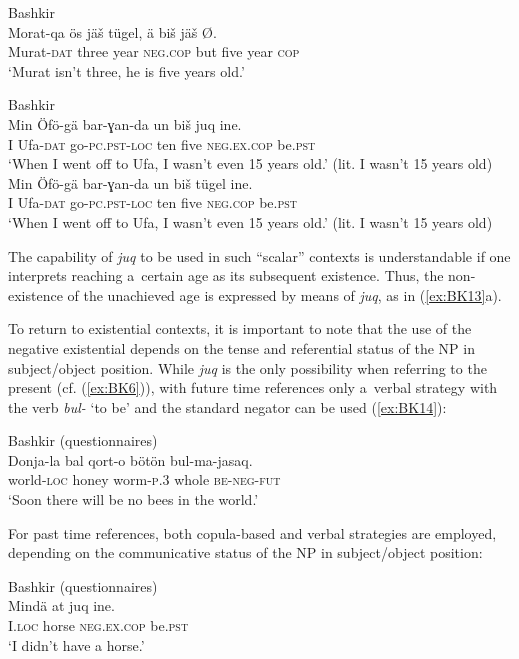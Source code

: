 \documentclass[output=paper]{langsci/langscibook}
\begin{document}
\ea Bashkir \citep[138]{mishchenko2017a} \label{ex:BK12}\\
	\gll Morat-qa	ös		jäš		tügel,			ä		biš		jäš		Ø.\\
	Murat-\textsc{dat}	three	year	\textsc{neg.cop}		but	five	year	\textsc{cop}\\
	\glt `Murat isn’t three, he is five years old.'
\z


\ea Bashkir \citep[139]{mishchenko2017a} \label{ex:BK13}\\
  \ea
	\gll Min	Öfö-gä	bar-ɣan-da		un		biš		juq			ine.\\
	I		Ufa-\textsc{dat}	go-\textsc{pc.pst-loc}	ten	five	\textsc{neg.ex.cop}	be.\textsc{pst}\\
	\glt `When I went off to Ufa, I wasn’t even 15 years old.' (lit. I wasn’t 15 years old)
  \ex
	\gll Min	Öfö-gä	bar-ɣan-da		un		biš		tügel			ine.\\
	I		Ufa-\textsc{dat}	go-\textsc{pc.pst-loc}	ten	five	\textsc{neg.cop}		be.\textsc{pst}\\
	\glt `When I went off to Ufa, I wasn’t even 15 years old.' (lit. I wasn’t 15 years old)
\z \z

The capability of \textit{juq} to be used in such “scalar” contexts is understandable if one interprets reaching a certain age as its subsequent existence. Thus, the non-existence of the unachieved age is expressed by means of \textit{juq}, as in (\ref{ex:BK13}a).

To return to existential contexts, it is important to note that the use of the negative existential depends on the tense and referential status of the NP in subject/object position. While \textit{juq} is the only possibility when referring to the present (cf. (\ref{ex:BK6})), with future time references only a verbal strategy with the verb \textit{bul-} ‘to be’ and the standard negator can be used (\ref{ex:BK14}):

\ea Bashkir (questionnaires) \label{ex:BK14}\\
	\gll Donja-la		bal		qort-o		bötön		bul-ma-jasaq.\\
	world-\textsc{loc}	honey	worm-\textsc{p.3}	whole	\textsc{be-neg-fut}\\
	\glt `Soon there will be no bees in the world.'
\z

For past time references, both copula-based and verbal strategies are employed, depending on the communicative status of the NP in subject/object position:

\ea Bashkir (questionnaires) \label{ex:BK15}\\
	\gll Mindä		at		juq				ine.\\
	I.\textsc{loc}		horse	\textsc{neg.ex.cop}		be.\textsc{pst}\\
	\glt `I didn’t have a horse.'
\z
\end{document}

